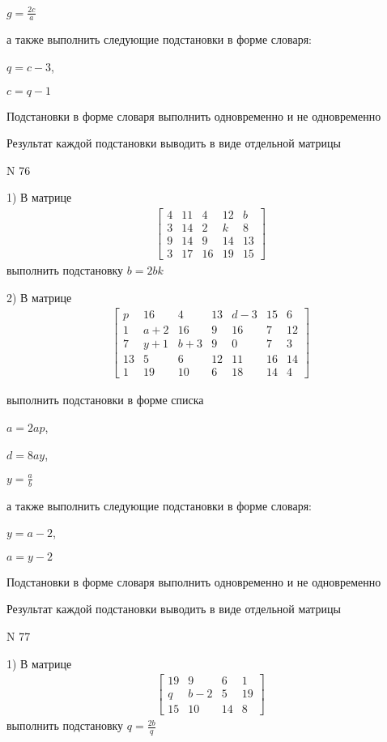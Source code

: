 \documentclass[11pt]{report}
\begin{document}
$g=\frac{2 c}{a}$

а также выполнить следующие подстановки в форме словаря:

$q=c - 3$,

$c=q - 1$


    Подстановки в форме словаря выполнить одновременно и не одновременно


    Результат каждой подстановки выводить в виде отдельной матрицы

\newpage
N 76


    1) В матрице
\begin{align*}
\left[\begin{matrix}4 & 11 & 4 & 12 & b\\3 & 14 & 2 & k & 8\\9 & 14 & 9 & 14 & 13\\3 & 17 & 16 & 19 & 15\end{matrix}\right]
\end{align*}
выполнить подстановку $b=2 b k$


    2) В матрице
\begin{align*}
\left[\begin{matrix}p & 16 & 4 & 13 & d - 3 & 15 & 6\\1 & a + 2 & 16 & 9 & 16 & 7 & 12\\7 & y + 1 & b + 3 & 9 & 0 & 7 & 3\\13 & 5 & 6 & 12 & 11 & 16 & 14\\1 & 19 & 10 & 6 & 18 & 14 & 4\end{matrix}\right]
\end{align*}

выполнить подстановки в форме списка

$a=2 a p$,

$d=8 a y$,

$y=\frac{a}{b}$

а также выполнить следующие подстановки в форме словаря:

$y=a - 2$,

$a=y - 2$


    Подстановки в форме словаря выполнить одновременно и не одновременно


    Результат каждой подстановки выводить в виде отдельной матрицы

\newpage
N 77


    1) В матрице
\begin{align*}
\left[\begin{matrix}19 & 9 & 6 & 1\\q & b - 2 & 5 & 19\\15 & 10 & 14 & 8\end{matrix}\right]
\end{align*}
выполнить подстановку $q=\frac{2 b}{q}$
\end{document}
